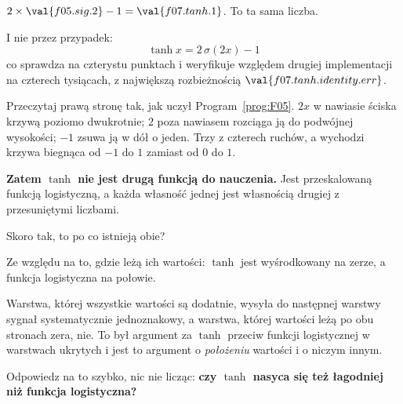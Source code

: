 \begin{fr}
\begin{ansblock}
$2 \times \val{f05.sig.2} - 1 = \val{f07.tanh.1}$. To ta sama liczba.
\end{ansblock}

I nie przez przypadek:
\[ \tanh x = 2\,\sigma(2x) - 1 \]
co  sprawdza na czterystu punktach i
weryfikuje względem drugiej implementacji na czterech tysiącach, z największą
rozbieżnością $\val{f07.tanh.identity.err}$.

Przeczytaj prawą stronę tak, jak uczył Program~\ref{prog:F05}. $2x$ w nawiasie
ściska krzywą poziomo dwukrotnie; $2$ poza nawiasem rozciąga ją do podwójnej
wysokości; $-1$ zsuwa ją w dół o jeden. Trzy z czterech ruchów, a wychodzi
krzywa biegnąca od $-1$ do $1$ zamiast od $0$ do $1$.

\textbf{Zatem $\tanh$ nie jest drugą funkcją do nauczenia.} Jest przeskalowaną
funkcją logistyczną, a każda własność jednej jest własnością drugiej z
przesuniętymi liczbami.

Skoro tak, to po co istnieją obie?
\nextframe
\end{fr}

\begin{fr}
\begin{ansblock}
Ze względu na to, gdzie leżą ich wartości: $\tanh$ jest wyśrodkowany na zerze,
a funkcja logistyczna na połowie.
\end{ansblock}

Warstwa, której wszystkie wartości są dodatnie, wysyła do następnej warstwy
sygnał systematycznie jednoznakowy, a warstwa, której wartości leżą po obu
stronach zera, nie. To był argument za $\tanh$ przeciw funkcji logistycznej w
warstwach ukrytych i jest to argument o \emph{położeniu} wartości i o niczym
innym.

Odpowiedz na to szybko, nic nie licząc:
\textbf{czy $\tanh$ nasyca się też łagodniej niż funkcja logistyczna?}
\dotline
\nextframe
\end{fr}

